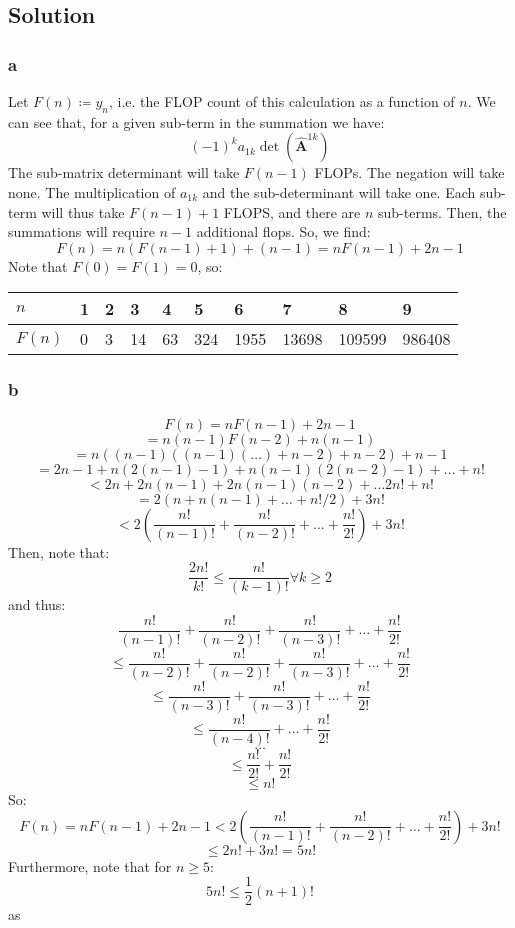 \documentclass[11pt]{report}
\theoremstyle{definition}
\newcommand{\mat}[1]{\mathbf{#1}}
\begin{document}
\subsection*{Solution}
\subsubsection*{a}
Let $F(n)\coloneqq y_n$, i.e. the FLOP count of this calculation as a function
of $n$.  We can see that, for a given sub-term in the summation we have:
\[(-1)^ka_{1k}\det(\widehat{\mat{A}}^{1k})\]
The sub-matrix determinant will take $F(n-1)$ FLOPs. The negation will take
none. The multiplication of $a_{1k}$ and the sub-determinant will take one.
Each sub-term will thus take $F(n-1)+1$ FLOPS, and there are $n$ sub-terms.
Then, the summations will require $n-1$ additional flops. So, we find:
\[F(n) = n(F(n-1)+1)+(n-1) = nF(n-1)+2n-1\]
Note that $F(0)= F(1) = 0$, so:
\begin{table}[h]
	\begin{center}

		\begin{tabular}{l|lllllllll}
			$n$    & 1 & 2 & 3  & 4  & 5   & 6    & 7     & 8      & 9      \\ \hline
			$F(n)$ & 0 & 3 & 14 & 63 & 324 & 1955 & 13698 & 109599 & 986408
		\end{tabular}
	\end{center}
\end{table}

\subsubsection*{b}
\[ F(n) = nF(n-1)+2n-1 \]
\[ = n(n-1)F(n-2)+n(n-1) \]
\[ = n((n-1)((n-1)(\ldots)+n-2)+n-2)+n-1\]
\[ = 2n-1+n(2(n-1)-1)+n(n-1)(2(n-2)-1)+\ldots+n!\]
\[ < 2n+2n(n-1)+2n(n-1)(n-2)+\ldots2n!+n!\]
\[ = 2(n+n(n-1)+\ldots+n!/2)+3n!\]
\[ <2\left(\frac{n!}{(n-1)!}+\frac{n!}{(n-2)!}+\ldots+\frac{n!}{2!}\right)+3n!\]
Then, note that:
\[\frac{2n!}{k!}\leq \frac{n!}{(k-1)!}\forall k\geq 2\]
and thus:
\[\frac{n!}{(n-1)!}+\frac{n!}{(n-2)!}+\frac{n!}{(n-3)!}+\ldots+\frac{n!}{2!}\]
\[\leq \frac{n!}{(n-2)!}+\frac{n!}{(n-2)!}+\frac{n!}{(n-3)!}+\ldots+\frac{n!}{2!}\]
\[\leq \frac{n!}{(n-3)!}+\frac{n!}{(n-3)!}+\ldots+\frac{n!}{2!}\]
\[\leq \frac{n!}{(n-4)!}+\ldots+\frac{n!}{2!}\]
\[\ldots\]
\[\leq \frac{n!}{2!}+\frac{n!}{2!}\]
\[\leq n!\]
So:
\[
	F(n)
	= nF(n-1)+2n-1
	< 2\left(\frac{n!}{(n-1)!}+\frac{n!}{(n-2)!}+\ldots+\frac{n!}{2!}\right)+3n!
\]
\[\leq 2n!+3n! = 5n!\]
Furthermore, note that for $n\geq5$:
\[5n! \leq \frac{1}{2}(n+1)!\]
as
\end{document}
